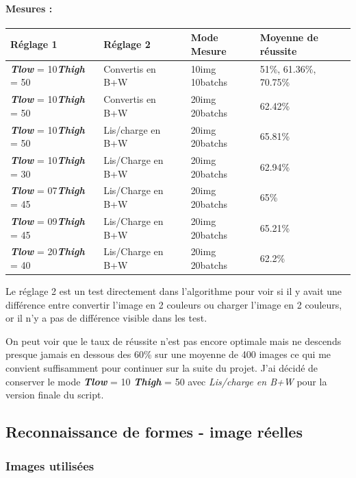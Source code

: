 	\paragraph{Mesures : }
	\begin{center}
		\begin{tabular}{l l | l l}
			Réglage 1 & Réglage 2 & Mode Mesure & Moyenne de réussite \\
			\hline
			\textit{\textbf{Tlow}} = 10\quad\textit{\textbf{Thigh}} = 50 &  Convertis en B+W & 10img 10batchs & 51\%, 61.36\%, 70.75\% \\
			\textit{\textbf{Tlow}} = 10\quad\textit{\textbf{Thigh}} = 50 &  Convertis en B+W & 20img 20batchs & 62.42\% \\
			\textit{\textbf{Tlow}} = 10\quad\textit{\textbf{Thigh}} = 50 & Lis/charge en B+W & 20img 20batchs & 65.81\% \\
			\textit{\textbf{Tlow}} = 10\quad\textit{\textbf{Thigh}} = 30 & Lis/Charge en B+W & 20img 20batchs & 62.94\% \\
			\textit{\textbf{Tlow}} = 07\quad\textit{\textbf{Thigh}} = 45 & Lis/Charge en B+W & 20img 20batchs & 65\% \\
			\textit{\textbf{Tlow}} = 09\quad\textit{\textbf{Thigh}} = 45 & Lis/Charge en B+W & 20img 20batchs & 65.21\% \\
			\textit{\textbf{Tlow}} = 20\quad\textit{\textbf{Thigh}} = 40 & Lis/Charge en B+W & 20img 20batchs & 62.2\% \\
		\end{tabular}
	\end{center}
	
	Le réglage 2 est un test directement dans l'algorithme pour voir si il y avait une différence entre convertir l'image en 2 couleurs ou charger l'image en 2 couleurs, or il n'y a pas de différence visible dans les test.
	
	On peut voir que le taux de réussite n'est pas encore optimale mais ne descends presque jamais en dessous des 60\% sur une moyenne de 400 images ce qui me convient suffisamment pour continuer sur la suite du projet. J'ai décidé de conserver le mode \textit{\textbf{Tlow}} = 10 \textit{\textbf{Thigh}} = 50 avec \textit{Lis/charge en B+W} pour la version finale du script.

\subsection{Reconnaissance de formes - image réelles}

	\subsubsection{Images utilisées}
	
